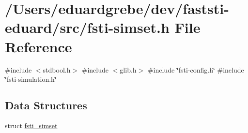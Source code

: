 \hypertarget{fsti-simset_8h}{}\section{/\+Users/eduardgrebe/dev/faststi-\/eduard/src/fsti-\/simset.h File Reference}
\label{fsti-simset_8h}
{\ttfamily \#include $<$stdbool.\+h$>$}\newline
{\ttfamily \#include $<$glib.\+h$>$}\newline
{\ttfamily \#include \char`\"{}fsti-\/config.\+h\char`\"{}}\newline
{\ttfamily \#include \char`\"{}fsti-\/simulation.\+h\char`\"{}}\newline
\subsection*{Data Structures}
\begin{DoxyCompactItemize}
\item 
struct \mbox{\hyperlink{structfsti__simset}{fsti\+\_\+simset}}
\end{DoxyCompactItemize}
